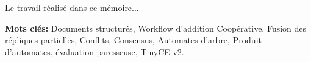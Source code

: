 \let\oldprintchaptertitle=\printchaptertitle
\renewcommand{\printchaptertitle}[1]{%
	\vspace*{-75pt}
	\oldprintchaptertitle{#1}
}%
\let\printchaptertitle=\oldprintchaptertitle
Le travail réalisé dans ce mémoire...

\vspace{1cm}
\noindent\textbf{Mots clés:} Documents structur\'es, Workflow d'addition Coop\'erative,  Fusion des r\'epliques partielles, Conflits, Consensus, Automates d'arbre, Produit d'automates,  évaluation paresseuse, TinyCE v2.

\myCleanStarChapterEnd
